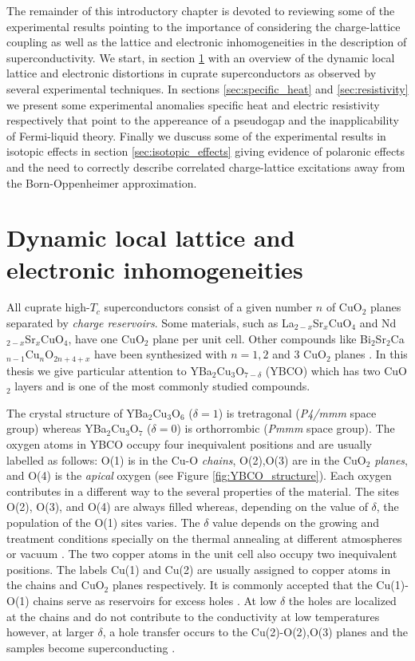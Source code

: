 The remainder of this introductory chapter is devoted to reviewing some of the experimental results pointing to the importance of considering the charge-lattice coupling as well as the lattice and electronic inhomogeneities in the description of superconductivity. 
We start, in section \ref{sec:dynamicDistortions} with an overview of the dynamic local lattice and electronic distortions in cuprate superconductors as observed by several experimental techniques. 
In sections \ref{sec:specific_heat} and \ref{sec:resistivity} we present some experimental anomalies specific heat and electric resistivity respectively that point to the appereance of a pseudogap and the inapplicability of Fermi-liquid theory.
Finally we duscuss some of the experimental results in isotopic effects in section \ref{sec:isotopic_effects} giving evidence of polaronic effects and the need to correctly describe correlated charge-lattice excitations away from the Born-Oppenheimer approximation.


\section{Dynamic local lattice and electronic inhomogeneities}
\label{sec:dynamicDistortions}

All cuprate high-$T_c$ superconductors consist of a given number $n$ of CuO$_2$ planes separated by \textit{charge reservoirs}.
Some materials, such as La$_{2-x}$Sr$_x$CuO$_4$ and Nd$_{2-x}$Sr$_x$CuO$_4$, have one CuO$_2$ plane per unit cell. 
Other compounds like Bi$_2$Sr$_2$Ca$_{n-1}$Cu$_n$O$_{2n+4+x}$ have been synthesized with $n=1,2$ and 3 CuO$_2$ planes \cite{Basov2005}.
In this thesis we give particular attention to YBa$_2$Cu$_3$O$_{7-\delta}$ (YBCO) which has two CuO$_2$ layers and is one of the most commonly studied compounds.

The crystal structure of YBa$_2$Cu$_3$O$_6$ ($\delta=1$) is tretragonal (\textit{P4/mmm} space group) whereas YBa$_2$Cu$_3$O$_7$ ($\delta=0$) is orthorrombic (\textit{Pmmm} space group).
The oxygen atoms in YBCO occupy four inequivalent positions and are usually labelled as follows: O(1) is in the Cu-O \textit{chains}, O(2),O(3) are in the CuO$_2$ \textit{planes}, and O(4) is the \textit{apical} oxygen (see Figure \ref{fig:YBCO_structure}).
Each oxygen contributes in a different way to the several properties of the material.
The sites O(2), O(3), and O(4) are always filled whereas, depending on the value of $\delta$, the population of the O(1) sites varies.
The $\delta$ value depends on the growing and treatment conditions specially on the thermal annealing at different atmospheres or vacuum \cite{Ivanov1995}.
The two copper atoms in the unit cell also occupy two inequivalent positions.
The labels Cu(1) and Cu(2) are usually assigned to copper atoms in the chains and CuO$_2$ planes respectively.
It is commonly accepted that the Cu(1)-O(1) chains serve as reservoirs for excess holes \cite{Pickett1989}. 
At low $\delta$ the holes are localized at the chains and do not contribute to the conductivity at low temperatures however, at larger $\delta$, a hole transfer occurs to the Cu(2)-O(2),O(3) planes and the samples become superconducting \cite{Cava1988}.

